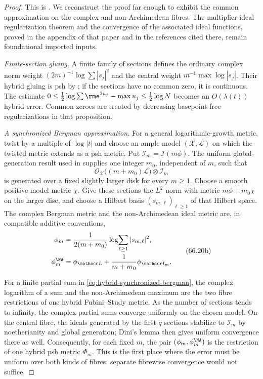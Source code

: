 \begin{proof}
This is \cite[Theorem~3.13]{PS23Hybrid}.  We reconstruct the proof far
enough to exhibit the common approximation on the complex and
non-Archimedean fibres.  The multiplier-ideal regularization theorem and
the convergence of the associated ideal functions, proved in the appendix
of that paper and in the references cited there, remain foundational
imported inputs.

\smallskip
\noindent\emph{Finite-section gluing.}
A finite family of sections defines the ordinary complex norm weight
$(2m)^{-1}\log\sum|s_j|^2$ and the central weight
$m^{-1}\max\log|s_j|$. Their hybrid gluing is psh by
\cite[Proposition~3.5 and Lemma~3.6]{PS23Hybrid}; if the sections have no
common zero, it is continuous. The estimate
$0\leq\tfrac12\log\sum\rme^{2u_j}-\max u_j\leq\tfrac12\log N$
becomes an $O(\lambda(t))$ hybrid error. Common zeroes are treated by
decreasing basepoint-free regularizations in that proposition.

\smallskip
\noindent\emph{A synchronized Bergman approximation.}
For a general logarithmic-growth metric, twist by a multiple of
$\log|t|$ and choose an ample model $(\mathscr X,\mathscr L)$ on which
the twisted metric extends as a psh metric.  Put
$\mathscr I_m=\mathscr I(m\phi)$.  The uniform global-generation result
used in \cite[Section~3.3]{PS23Hybrid} supplies one integer $m_0$,
independent of $m$, such that
\[
 \mathcal O_{\mathscr X}
   \bigl((m+m_0)\mathscr L\bigr)\otimes\mathscr I_m
\tag{66.20a}\label{eq:hybrid-uniform-global-generation}
\]
is generated over a fixed slightly larger disk for every $m\geq1$.
Choose a smooth positive model metric $\chi$. Give these sections the
$L^2$ norm with metric $m\phi+m_0\chi$ on the larger disc, and choose a
Hilbert basis $(s_{m,\ell})_{\ell\geq1}$ of that Hilbert space.  The complex Bergman metric and the non-Archimedean ideal metric
are, in compatible additive conventions,
\[
\begin{aligned}
 \phi_m
  &=\frac{1}{2(m+m_0)}
       \log\!\sum_{\ell\geq1}|s_{m,\ell}|^2,\\
 \phi_m^{\NA}
  &=\phi_{\mathscr L}
       +\frac{1}{m+m_0}\phi_{\mathscr I_m}.
\end{aligned}
\tag{66.20b}\label{eq:hybrid-synchronized-bergman}
\]

For a finite partial sum in \eqref{eq:hybrid-synchronized-bergman}, the
complex logarithm of a sum and the non-Archimedean maximum are the two
fibre restrictions of one hybrid Fubini--Study metric.  As the number of
sections tends to infinity, the complex partial sums converge uniformly on
the chosen model.  On the central fibre, the ideals generated by the first
$q$ sections stabilize to $\mathscr I_m$ by noetherianity and global
generation; Dini's lemma then gives uniform convergence there as well.
Consequently, for each fixed $m$, the pair
$(\phi_m,\phi_m^{\NA})$ is the restriction of one hybrid psh metric
$\Phi_m$.  This is the first place where the error must be uniform over
both kinds of fibres: separate fibrewise convergence would not suffice.


\end{proof}

